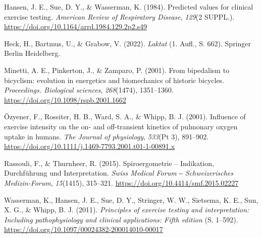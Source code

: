 \documentclass[
  letterpaper,
  DIV=11]{scrartcl}
\newlength{\cslhangindent}
\newenvironment{CSLReferences}[2] %
 {\begin{list}{}{%
  \setlength{\itemindent}{0pt}
  \setlength{\leftmargin}{0pt}
  \setlength{\parsep}{0pt}
  \ifodd #1
   \setlength{\leftmargin}{\cslhangindent}
   \setlength{\itemindent}{-1\cslhangindent}
  \fi
  \setlength{\itemsep}{#2\baselineskip}}}
 {\end{list}}
\begin{document}
\label{refs}
\begin{CSLReferences}{1}{0}
Hansen, J. E., Sue, D. Y., \& Wasserman, K. (1984). {Predicted values
for clinical exercise testing}. \emph{American Review of Respiratory
Disease}, \emph{129}(2 SUPPL.).
\url{https://doi.org/10.1164/arrd.1984.129.2p2.s49}

Heck, H., Bartmus, U., \& Grabow, V. (2022). \emph{{Laktat}} (1. Aufl.,
S. 662). Springer Berlin Heidelberg.

Minetti, A. E., Pinkerton, J., \& Zamparo, P. (2001). {From bipedalism
to bicyclism: evolution in energetics and biomechanics of historic
bicycles.} \emph{Proceedings. Biological sciences}, \emph{268}(1474),
1351--1360. \url{https://doi.org/10.1098/rspb.2001.1662}

Özyener, F., Rossiter, H. B., Ward, S. A., \& Whipp, B. J. (2001).
{Influence of exercise intensity on the on- and off-transient kinetics
of pulmonary oxygen uptake in humans.} \emph{The Journal of physiology},
\emph{533}(Pt 3), 891--902.
\url{https://doi.org/10.1111/j.1469-7793.2001.t01-1-00891.x}

Rassouli, F., \& Thurnheer, R. (2015). {Spiroergometrie -- Indikation,
Durchf{ü}hrung und Interpretation}. \emph{Swiss Medical Forum ‒
Schweizerisches Medizin-Forum}, \emph{15}(1415), 315--321.
\url{https://doi.org/10.4414/smf.2015.02227}

Wasserman, K., Hansen, J. E., Sue, D. Y., Stringer, W. W., Sietsema, K.
E., Sun, X. G., \& Whipp, B. J. (2011). \emph{{Principles of exercise
testing and interpretation: Including pathophysiology and clinical
applications: Fifth edition}} (S. 1--592).
\url{https://doi.org/10.1097/00024382-200014010-00017}

\end{CSLReferences}
\end{document}
